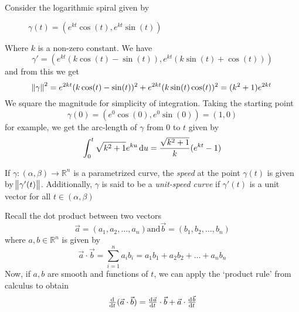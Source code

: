 \begin{example}
    Consider the logarithmic spiral given by
    \begin{figure}[h]
        \centering
        \caption*{\(\gamma(t) = (e^{kt}\cos(t), e^{kt}\sin(t))\)}
    \end{figure}
    Where \(k\) is a non-zero constant. We have
    \[
        \gamma' = (e^{kt}(k \cos(t) - \sin(t)), e^{kt}(k \sin(t) + \cos(t)))
    \]
    and from this we get
    \[
        \norm{\gamma}^{2} = e^{2kt}(k \cos(t) - \sin(t))^{2} + e^{2kt}(k \sin(t) \cos(t))^{2} = (k^{2} + 1)e^{2kt}
    \]
    We square the magnitude for simplicity of integration. Taking the starting point
    \[
        \gamma(0) = (e^{0} \cos(0), e^{0} \sin(0)) = (1, 0)
    \]
    for example, we get the arc-length of \(\gamma\) from \(0\) to \(t\) given by
    \[
        \int_{0}^{t} \sqrt{k^{2} + 1}e^{ku} \dif u = \frac{\sqrt{k^{2} + 1}}{k}(e^{kt} -1)
    \]
\end{example}

\begin{definition}
    If \(\gamma : (\alpha, \beta) \rightarrow \mathbb{R}^{n}\) is a parametrized curve, the \textit{speed} at the point \(\gamma(t)\) is given by \(\norm{\gamma'(t)}\). Additionally, \(\gamma\) is said to be a \textit{unit-speed curve} if \(\gamma'(t)\) is a unit vector for all \(t \in (\alpha, \beta)\)
\end{definition}

Recall the dot product between two vectors
\[
    \vec{a} = (a_{1}, a_{2}, \ldots, a_{n}) \text{and} \vec{b} = (b_{1}, b_{2}, \ldots, b_{n})
\]
where \(a, b \in \mathbb{R}^{n}\) is given by
\[
    \vec{a} \cdot \vec{b} = \sum_{i = 1}^{n} a_{i}b_{i} = a_{1}b_{1} + a_{2}b_{2} + \ldots + a_{n}b_{n}
\]
Now, if \(a,b\) are smooth and functions of \(t\), we can apply the `product rule' from calculus to obtain
\[
    \od{}{t}(\vec{a} \cdot \vec{b}) = \od{\vec{a}}{t} \cdot \vec{b} + \vec{a} \cdot \od{\vec{b}}{t}
\]

